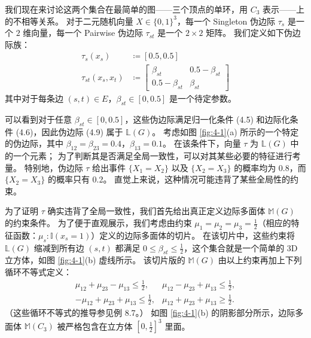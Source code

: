 \begin{tcolorbox}
\begin{exam}

我们现在来讨论这两个集合在最简单的图——三个顶点的单环，用 $C_3$ 表示——上的不相等关系。
对于二元随机向量 $X \in \{0, 1\}^3$，每一个 Singleton 伪边际 $\tau_s$ 是一个 $2$ 维向量，每一个 Pairwise 伪边际 $\tau_{st}$ 是一个 $2 \times 2$ 矩阵。
我们定义如下伪边际族：
\begin{subequations}
\begin{align}
    \tau_s(x_s) &\coloneqq [0.5, 0.5] \\
    \tau_{st}(x_s, x_t) &\coloneqq \begin{bmatrix}
        \beta_{st} & 0.5-\beta_{st} \\
        0.5-\beta_{st} & \beta_{st}
    \end{bmatrix}
\end{align}
\end{subequations}
其中对于每条边 $(s, t) \in E$，$\beta_{st} \in [0, 0.5]$ 是一个待定参数。

可以看到对于任意 $\beta_{st} \in [0, 0.5]$，这些伪边际满足归一化条件 (4.5) 和边际化条件 (4.6)，因此伪边际 (4.9) 属于 $\mathbb{L}(G)$。
考虑如图 \ref{fig:4-1}(a) 所示的一个特定的伪边际，其中 $\beta_{12} = \beta_{23} = 0.4$，$\beta_{13} = 0.1$。
在该条件下，向量 $\tau$ 为 $\mathbb{L}(G)$ 中的一个元素；
为了判断其是否满足全局一致性，可以对其某些必要的特征进行考量。
特别地，伪边际 $\tau$ 给出事件 $\{X_1 = X_2\}$ 以及 $\{X_2 = X_3\}$ 的概率均为 0.8，而 $\{X_2 = X_3\}$ 的概率只有 0.2。
直觉上来说，这种情况可能违背了某些全局性的约束。

为了证明 $\tau$ 确实违背了全局一致性，我们首先给出真正定义边际多面体 $\mathbb{M}(G)$ 的约束条件。
为了便于直观展示，我们考虑由约束 $\mu_1 = \mu_2 = \mu_3 = \frac{1}{2}$（相应的特征函数：$\mu_s: \mathbb{I}(x_s = 1)$）定义的边际多面体的切片。
在该切片中，这些约束将 $\mathbb{L}(G)$ 缩减到所有边 $(s, t)$ 都满足 $0 \leq \beta_{st} \leq \frac{1}{2}$，这个集合就是一个简单的 3D 立方体，如图 \ref{fig:4-1}(b) 虚线所示。
该切片版的 $\mathbb{M}(G)$ 由以上约束再加上下列循环不等式定义：
\begin{subequations}
\begin{align}
    \mu_{12} + \mu_{23} - \mu_{13} \leq \frac{1}{2}, &\mu_{12} - \mu_{23} + \mu_{13} \leq \frac{1}{2}, \\
    -\mu_{12} + \mu_{23} + \mu_{13} \leq \frac{1}{2}, &\mu_{12} + \mu_{23} + \mu_{13} \geq \frac{1}{2}.
\end{align}
\end{subequations}
（这些循环不等式的推导参见例 8.7。）
如图 \ref{fig:4-1}(b) 的阴影部分所示，边际多面体 $\mathbb{M}(C_3)$ 被严格包含在立方体 $[0, \frac{1}{2}]^3$ 里面。


\end{exam}
\end{tcolorbox}
